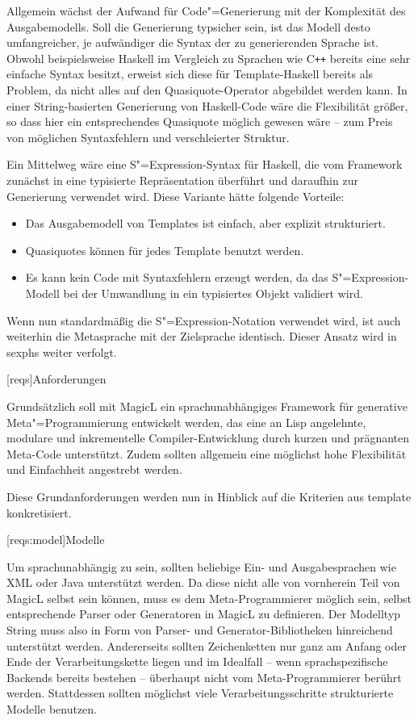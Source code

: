\documentclass[11pt, a4paper, bibgerm]{scrbook}
\newcommand\lchapter{}
\newcommand\lsection{}
\newcommand\cref{}
\newcommand{\sexp}{S"=Expression}
\newcommand{\cgen}{Code"=Generierung}
\newcommand{\mprog}{Meta"=Programmierung}
\newcommand{\cpp}{C\texttt{++}}
\begin{document}
Allgemein wächst der Aufwand für \cgen{} mit der Komplexität des
Ausgabemodells. Soll die Generierung typsicher sein, ist das Modell
desto umfangreicher, je aufwändiger die Syntax der zu generierenden
Sprache ist. Obwohl beispielsweise Haskell im Vergleich zu Sprachen wie
\cpp{} bereits eine sehr einfache Syntax besitzt, erweist sich diese für
Template-Haskell bereits als Problem, da nicht alles auf den
Quasiquote-Operator abgebildet werden kann. In einer String-basierten
Generierung von Haskell-Code wäre die Flexibilität größer, so dass hier
ein entsprechendes Quasiquote möglich gewesen wäre -- zum Preis von
möglichen Syntaxfehlern und verschleierter Struktur.

Ein Mittelweg wäre eine \sexp{}-Syntax für Haskell, die vom Framework
zunächst in eine typisierte Repräsentation überführt und daraufhin zur
Generierung verwendet wird. Diese Variante hätte folgende Vorteile:
\begin{itemize}
\item Das Ausgabemodell von Templates ist einfach, aber explizit
  strukturiert.
\item Quasiquotes können für jedes Template benutzt werden.
\item Es kann kein Code mit Syntaxfehlern erzeugt werden, da das
  \sexp{}-Modell bei der Umwandlung in ein typisiertes Objekt
  validiert wird.
\end{itemize}
Wenn nun standardmäßig die \sexp{}-Notation verwendet wird, ist auch
weiterhin die Metasprache mit der Zielsprache identisch. Dieser Ansatz
wird in \cref{sexphs} weiter verfolgt.

\lchapter[reqs]{Anforderungen}

Grundsätzlich soll mit MagicL ein sprachunabhängiges Framework für
generative \mprog{} entwickelt werden, das eine an Lisp angelehnte,
modulare und inkrementelle Compiler-Entwicklung durch kurzen und
prägnanten Meta-Code unterstützt. Zudem sollten allgemein eine möglichst
hohe Flexibilität und Einfachheit angestrebt werden.

Diese Grundanforderungen werden nun in Hinblick auf die Kriterien aus
\cref{template} konkretisiert.

\lsection[reqs:model]{Modelle}

Um sprachunabhängig zu sein, sollten beliebige Ein- und Ausgabesprachen
wie XML oder Java unterstützt werden. Da diese nicht alle von vornherein
Teil von MagicL selbst sein können, muss es dem Meta-Programmierer
möglich sein, selbst entsprechende Parser oder Generatoren in MagicL zu
definieren. Der Modelltyp String muss also in Form von Parser- und
Generator-Bibliotheken hinreichend unterstützt werden. Andererseits
sollten Zeichenketten nur ganz am Anfang oder Ende der
Verarbeitungskette liegen und im Idealfall -- wenn sprachspezifische
Backends bereits bestehen -- überhaupt nicht vom Meta-Programmierer
berührt werden. Stattdessen sollten möglichst viele
Verarbeitungsschritte strukturierte Modelle benutzen. 
\end{document}
